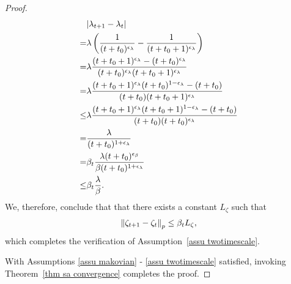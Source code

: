 \documentclass[twoside,11pt]{article}
\numberwithin{assucounter}{section}
\begin{document}
\begin{proof}
\begin{align}
    &\abs{\lambda_{t+1} - \lambda_t} \\
    =& \lambda\left(\frac{1}{(t+t_0)^{\epsilon_\lambda}} - \frac{1}{(t+t_0+1)^{\epsilon_\lambda}}\right) \\
    =& \lambda\frac{ (t+t_0+1)^{\epsilon_\lambda} - (t+t_0)^{\epsilon_\lambda} }{(t+t_0)^{\epsilon_\lambda} (t+t_0+1)^{\epsilon_\lambda}} \\
    =& \lambda\frac{ (t+t_0+1)^{\epsilon_\lambda} (t+t_0)^{1-\epsilon_\lambda} - (t+t_0) }{(t+t_0) (t+t_0+1)^{\epsilon_\lambda}} \\
    \leq & \lambda\frac{ (t+t_0+1)^{\epsilon_\lambda} (t+t_0+1)^{1-\epsilon_\lambda} - (t+t_0) }{(t+t_0) (t+t_0)^{\epsilon_\lambda}} \\
    = & \frac{ \lambda }{(t+t_0)^{1 + \epsilon_\lambda} } \\
    = & \beta_t \frac{ \lambda (t+t_0)^{\epsilon_\beta} }{ \beta (t+t_0)^{1 + \epsilon_\lambda} } \\
    \leq &\beta_t \frac{\lambda}{\beta}.
  \end{align}
  We, therefore, conclude that
  that there exists a constant $L_\zeta$ 
  such that 
  \begin{align}
    \label{eq lzeta sac}
    \norm{\zeta_{t+1} - \zeta_t}_p \leq \beta_t L_\zeta,
  \end{align}
  which completes the verification of Assumption~\ref{assu twotimescale}.

  With Assumptions \ref{assu makovian} - \ref{assu twotimescale} satisfied,
  invoking Theorem~\ref{thm sa convergence} completes the proof. 
\end{proof}
\end{document}
